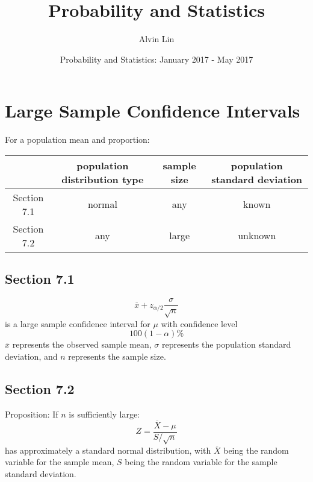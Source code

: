 \documentclass{math}
\title{Probability and Statistics}
\author{Alvin Lin}
\date{Probability and Statistics: January 2017 - May 2017}
\begin{document}
\maketitle

\section*{Large Sample Confidence Intervals}
For a population mean and proportion:
\begin{center}
  \begin{tabular}{|c|c|c|c|}
    \hline
    & population distribution type & sample size &
      population standard deviation \\
    \hline
    Section 7.1 & normal & any & known \\
    \hline
    Section 7.2 & any & large & unknown \\
    \hline
  \end{tabular}
\end{center}

\subsection*{Section 7.1}
\[ \overline{x}+z_{\alpha/2}\frac{\sigma}{\sqrt{n}} \]
is a large sample confidence interval for \( \mu \) with confidence level
\[ 100(1-\alpha)\% \]
\( \overline{x} \) represents the observed sample mean, \( \sigma \) represents
the population standard deviation, and \( n \) represents the sample size.

\subsection*{Section 7.2}
Proposition: If \( n \) is sufficiently large:
\[ Z = \frac{\overline{X}-\mu}{S/\sqrt{n}} \]
has approximately a standard normal distribution, with \( \overline{X} \) being
the random variable for the sample mean, \( S \) being the random variable for
the sample standard deviation.
\end{document}

